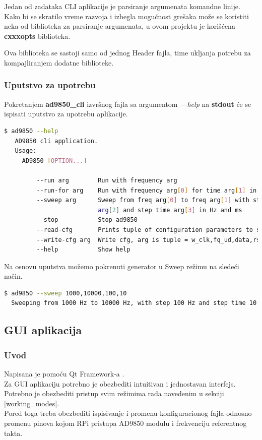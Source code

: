 Jedan od zadataka CLI aplikacije je parsiranje argumenata komandne linije.
Kako bi se skratilo vreme razvoja i izbegla mogućnost grešaka može se koristiti
neka od biblioteka za parsiranje argumenata, u ovom projektu je korišćena
\textbf{cxxxopts}\cite{cxxopts} biblioteka.

Ova biblioteka se sastoji samo od jednog Header fajla, time ukljanja potrebu za
kompajliranjem dodatne biblioteke.

\subsubsection{Uputstvo za upotrebu}

Pokretanjem \textbf{ad9850\_cli} izvršnog fajla sa argumentom \emph{---help} na
\textbf{stdout} će se ispisati uputstvo za upotrebu aplikacije. \\

\begin{lstlisting}[language=bash, caption=ad9850\_cli help opcija]
   $ ad9850 --help
   AD9850 cli application.
   Usage:
     AD9850 [OPTION...]

         --run arg        Run with frequency arg
         --run-for arg    Run with frequency arg[0] for time arg[1] in ms
         --sweep arg      Sweep from freq arg[0] to freq arg[1] with step freq
                          arg[2] and step time arg[3] in Hz and ms
         --stop           Stop ad9850
         --read-cfg       Prints tuple of configuration parameters to stdout
         --write-cfg arg  Write cfg, arg is tuple = w_clk,fq_ud,data,rst,dds_clk
         --help           Show help

\end{lstlisting} %

Na osnovu uputstva možemo pokrenuti generator u Sweep režimu na sledeći način.

\begin{lstlisting}[language=bash, caption=ad9850\_cli sweep opcija]
  $ ad9850 --sweep 1000,10000,100,10
  Sweeping from 1000 Hz to 10000 Hz, with step 100 Hz and step time 10 ms
\end{lstlisting} %
\subsection{GUI aplikacija}

\subsubsection{Uvod}
Napisana je pomoću Qt Framework-a \cite{qt}. \\
Za GUI aplikaciju potrebno je obezbediti intuitivan i jednostavan interfejs.
Potrebno je obezbediti pristup svim režimima rada navedenim u sekciji
\ref{working_modes}. \\
Pored toga treba obezbediti ispisivanje i promenu konfiguracionog fajla odnosno
promenu pinova kojom RPi pristupa AD9850 modulu i frekvenciju referentnog takta.

